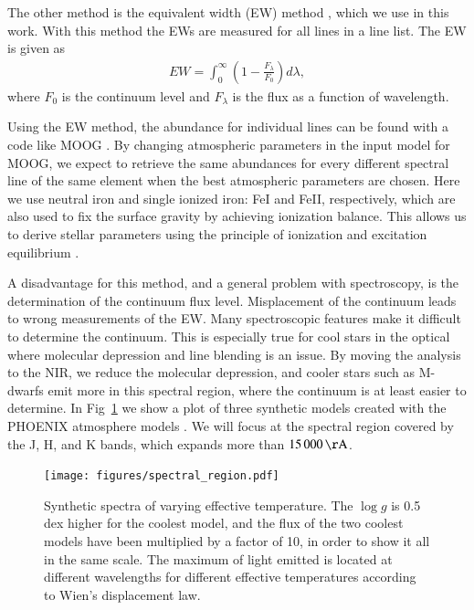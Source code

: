\documentclass{aa}
\begin{document}
The other method is the equivalent width (EW) method \citep{Sousa2008a},
which we use in this work. With this method the EWs are measured for all
lines in a line list. The EW is given as
\begin{align}
    \label{eq:EW}
    EW = \int_0^\infty \left(1 - \frac{F_\lambda}{F_0}\right) d\lambda,
\end{align}
where $F_0$ is the continuum level and $F_\lambda$ is the flux as a
function of wavelength.

Using the EW method, the abundance for individual lines can be found
with a code like MOOG \citep{Sneden1973}. By changing atmospheric
parameters in the input model for MOOG, we expect to retrieve the same
abundances for every different spectral line of the same element when
the best atmospheric parameters are chosen. Here we use neutral iron and
single ionized iron: FeI and FeII, respectively, which are also used to
fix the surface gravity by achieving ionization balance. This allows
us to derive stellar parameters using the principle of ionization and
excitation equilibrium \citep{Gray2006}.

A disadvantage for this method, and a general problem with spectroscopy,
is the determination of the continuum flux level. Misplacement of the
continuum leads to wrong measurements of the EW. Many spectroscopic
features make it difficult to determine the continuum. This is
especially true for cool stars in the optical where molecular depression
and line blending is an issue. By moving the analysis to the NIR, we
reduce the molecular depression, and cooler stars such as M-dwarfs
emit more in this spectral region, where the continuum is at least
easier to determine. In Fig~\ref{fig:spectral_region} we show a plot
of three synthetic models created with the PHOENIX atmosphere models
\citep{Husser2013}. We will focus at the spectral region covered by the
J, H, and K bands, which expands more than $\SI{15000}{\AA}$.

\begin{figure}[tbp!]
    \centering
    \texttt{[image: figures/spectral\_region.pdf]}
    \caption{Synthetic spectra of varying effective temperature. The $\log g$
    is 0.5 dex higher for the coolest model, and the flux of the two coolest models
    have been multiplied by a factor of 10, in order to show it all in the same
    scale. The maximum of light emitted is located at different wavelengths for
    different effective temperatures according to Wien's displacement law.}
    \label{fig:spectral_region}
\end{figure}
\end{document}
